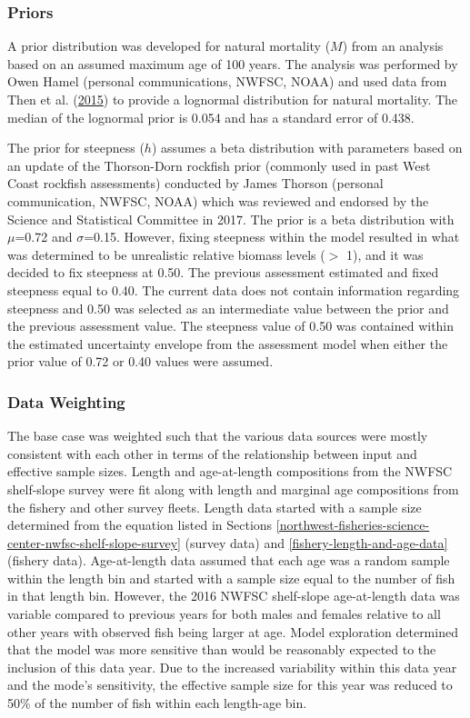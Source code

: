 \documentclass[12pt,]{article}
\begin{document}
\subsubsection{Priors}\label{priors}

A prior distribution was developed for natural mortality (\(M\)) from an
analysis based on an assumed maximum age of 100 years. The analysis was
performed by Owen Hamel (personal communications, NWFSC, NOAA) and used
data from Then et al.
(\protect\hyperlink{ref-then_evaluating_2015}{2015}) to provide a
lognormal distribution for natural mortality. The median of the
lognormal prior is 0.054 and has a standard error of 0.438.

The prior for steepness (\(h\)) assumes a beta distribution with
parameters based on an update of the Thorson-Dorn rockfish prior
(commonly used in past West Coast rockfish assessments) conducted by
James Thorson (personal communication, NWFSC, NOAA) which was reviewed
and endorsed by the Science and Statistical Committee in 2017. The prior
is a beta distribution with \(\mu\)=0.72 and \(\sigma\)=0.15. However,
fixing steepness within the model resulted in what was determined to be
unrealistic relative biomass levels (\(>\) 1), and it was decided to fix
steepness at 0.50. The previous assessment estimated and fixed steepness
equal to 0.40. The current data does not contain information regarding
steepness and 0.50 was selected as an intermediate value between the
prior and the previous assessment value. The steepness value of 0.50 was
contained within the estimated uncertainty envelope from the assessment
model when either the prior value of 0.72 or 0.40 values were assumed.

\subsubsection{Data Weighting}\label{data-weighting}

The base case was weighted such that the various data sources were
mostly consistent with each other in terms of the relationship between
input and effective sample sizes. Length and age-at-length compositions
from the NWFSC shelf-slope survey were fit along with length and
marginal age compositions from the fishery and other survey fleets.
Length data started with a sample size determined from the equation
listed in Sections
\ref{northwest-fisheries-science-center-nwfsc-shelf-slope-survey}
(survey data) and \ref{fishery-length-and-age-data} (fishery data).
Age-at-length data assumed that each age was a random sample within the
length bin and started with a sample size equal to the number of fish in
that length bin. However, the 2016 NWFSC shelf-slope age-at-length data
was variable compared to previous years for both males and females
relative to all other years with observed fish being larger at age.
Model exploration determined that the model was more sensitive than
would be reasonably expected to the inclusion of this data year. Due to
the increased variability within this data year and the mode's
sensitivity, the effective sample size for this year was reduced to 50\%
of the number of fish within each length-age bin.
\end{document}
